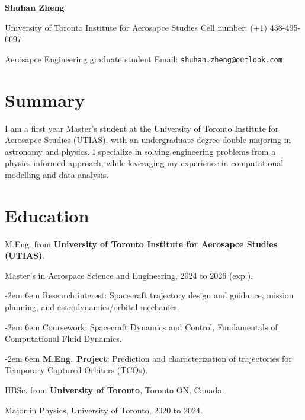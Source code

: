 \documentclass{article}
\newcommand{\cvsection}[1]{\section*{\rmfamily#1}}
\begin{document}
\begin{center}
    \Huge{
    \rmfamily
    \textbf{Shuhan Zheng}}
\end{center}
\vspace{15pt}    

\setlength{\parskip}{0.5pt}
\renewcommand{\arraystretch}{1.25}

\large
\noindent University of Toronto Institute for Aerosapce Studies  \hfill Cell number: (+1) 438-495-6697

\noindent Aerosapce Engineering graduate student \hfill {Email: \texttt{shuhan.zheng@outlook.com}}


\setlength{\parskip}{2pt}



\cvsection{Summary}

\indent I am a first year Master's student at the University of Toronto Institute for Aerosapce Studies (UTIAS), with an undergraduate degree double majoring in astronomy and physics. I specialize in solving engineering problems from a physics-informed approach, while leveraging my experience in computational modelling and data analysis. 

\setlength{\parindent}{2em}

\cvsection{Education}
\indent 

M.Eng. from \textbf{University of Toronto Institute for Aerosapce Studies (UTIAS)}.

\hspace{2em} Master's in Aerospace Science and Engineering, 2024 to 2026 (exp.).

{\parindent -2em
\leftskip 6em 
Research interest: Spacecraft trajectory design and guidance, mission planning, and astrodynamics/orbital mechanics.

}

{\parindent -2em
\leftskip 6em 
Coursework: Spacecraft Dynamics and Control, Fundamentals of Computational Fluid Dynamics.

}

{\parindent -2em
\leftskip 6em
\textbf{M.Eng. Project}: Prediction and characterization of trajectories for Temporary Captured Orbiters (TCOs). 

}

HBSc. from \textbf{University of Toronto}, Toronto ON, Canada.

\hspace{2em} Major in Physics, University of Toronto, 2020 to 2024.
\end{document}
